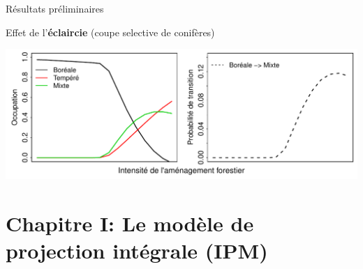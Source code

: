 \documentclass[11pt, compress, aspectratio=1610]{beamer}
\begin{document}
\begin{frame}{Résultats préliminaires}
\protect\hypertarget{ruxe9sultats-pruxe9liminaires-1}{}

Effet de l’\textbf{éclaircie} (coupe selective de conifères)

\centering

\includegraphics[scale=0.65]{figures/result1.pdf}

\par

\end{frame}

\hypertarget{chapitre-i-le-moduxe8le-de-projection-intuxe9grale-ipm}{%
\section{\texorpdfstring{Chapitre I: \newline Le modèle de projection
intégrale
(IPM)}{Chapitre I: Le modèle de projection intégrale (IPM)}}\label{chapitre-i-le-moduxe8le-de-projection-intuxe9grale-ipm}}
\end{document}
